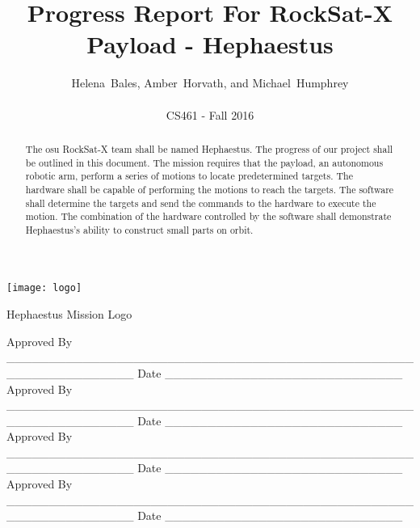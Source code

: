 \documentclass[letterpaper,10pt]{article}
\title{Progress Report For RockSat-X Payload - Hephaestus}
\author{Helena~Bales, Amber~Horvath, and Michael~Humphrey\\ \\ CS461 - Fall 2016}
\newenvironment{bottompar}{\par\vspace*{\fill}}{\clearpage}
\begin{document}
\maketitle

\begin{abstract}
The \gls{osu} RockSat-X team shall be named Hephaestus.
The progress of our project shall be outlined in this document.
The mission requires that the \gls{payload}, an autonomous robotic arm, perform a series of motions to locate predetermined targets.
The hardware shall be capable of performing the motions to reach the targets.
The software shall determine the targets and send the commands to the hardware to execute the motion.
The combination of the hardware controlled by the software shall demonstrate Hephaestus's ability to construct small parts on orbit.
\end{abstract}

\begin{center}
\texttt{[image: logo]}

Hephaestus Mission Logo
\end{center}

\begin{bottompar}
Approved By
\_\_\_\_\_\_\_\_\_\_\_\_\_\_\_\_\_\_\_\_\_\_\_\_\_\_\_\_\_\_\_\_\_\_\_\_\_\_\_\_\_\_\_\_\_\_\_\_\_\_\_\_\_\_\_\_\_\_\_\_\_\_\_
Date \_\_\_\_\_\_\_\_\_\_\_\_\_\_\_\_\_\_\_\_\_\_\_\_\_\_\_\_ \\


Approved By
\_\_\_\_\_\_\_\_\_\_\_\_\_\_\_\_\_\_\_\_\_\_\_\_\_\_\_\_\_\_\_\_\_\_\_\_\_\_\_\_\_\_\_\_\_\_\_\_\_\_\_\_\_\_\_\_\_\_\_\_\_\_\_
Date \_\_\_\_\_\_\_\_\_\_\_\_\_\_\_\_\_\_\_\_\_\_\_\_\_\_\_\_ \\


Approved By
\_\_\_\_\_\_\_\_\_\_\_\_\_\_\_\_\_\_\_\_\_\_\_\_\_\_\_\_\_\_\_\_\_\_\_\_\_\_\_\_\_\_\_\_\_\_\_\_\_\_\_\_\_\_\_\_\_\_\_\_\_\_\_
Date \_\_\_\_\_\_\_\_\_\_\_\_\_\_\_\_\_\_\_\_\_\_\_\_\_\_\_\_ \\


Approved By
\_\_\_\_\_\_\_\_\_\_\_\_\_\_\_\_\_\_\_\_\_\_\_\_\_\_\_\_\_\_\_\_\_\_\_\_\_\_\_\_\_\_\_\_\_\_\_\_\_\_\_\_\_\_\_\_\_\_\_\_\_\_\_
Date \_\_\_\_\_\_\_\_\_\_\_\_\_\_\_\_\_\_\_\_\_\_\_\_\_\_\_\_ \\
\end{bottompar}

\clearpage
\tableofcontents
\clearpage
\end{document}
